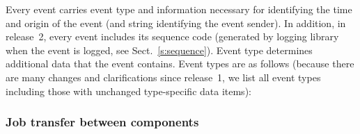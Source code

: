 \documentclass{egee}
\begin{document}
Every event carries event type and information necessary for identifying the
time and origin of the event (\jobid and string identifying the event
sender). In addition, in release~2, every event includes its sequence code (generated by logging library
when the event is logged, see Sect.~\ref{s:sequence}).
Event type determines additional
data that the event contains. Event types are as follows (because there are many
changes and clarifications since release~1, we list all event types including those with unchanged
type-specific data items):

\def\jobregister{\emph{Job\-Register}}
\def\jobtransfer{\emph{Job\-Transfer}}
\def\jobaccepted{\emph{Job\-Accepted}}
\def\jobrefused{\emph{Job\-Re\-fused}}
\def\jobenqueue{\emph{Job\-EnQueued}}
\def\jobdequeue{\emph{Job\-DeQueued}}

\def\helpercall{\emph{Helper\-Call}}
\def\helperret{\emph{Helper\-Return}}

\def\txfrev{\jobtransfer, \jobaccepted, \jobrefused}

\def\jobpending{\emph{Job\-Pending}}
\def\jobmatch{\emph{Job\-Match}}

\def\jobpurge{\emph{Job\-Purge}}
\def\jobabort{\emph{Job\-Abort}}
\def\jobcancel{\emph{Job\-Cancel}}
\def\jobrun{\emph{Job\-Run\-ning}}
\def\jobdone{\emph{Job\-Done}}
\def\jobcleared{\emph{Job\-Cleared}}
\def\jobresub{\emph{Job\-Resubmission}}

\def\jobchkpt{\emph{Job\-Chkpt}}
\def\joblistener{\emph{Job\-Listener}}
\def\jobcurjdl{\emph{Job\-Cur\-Descr}}

\subsubsection{Job transfer between components}
\end{document}
